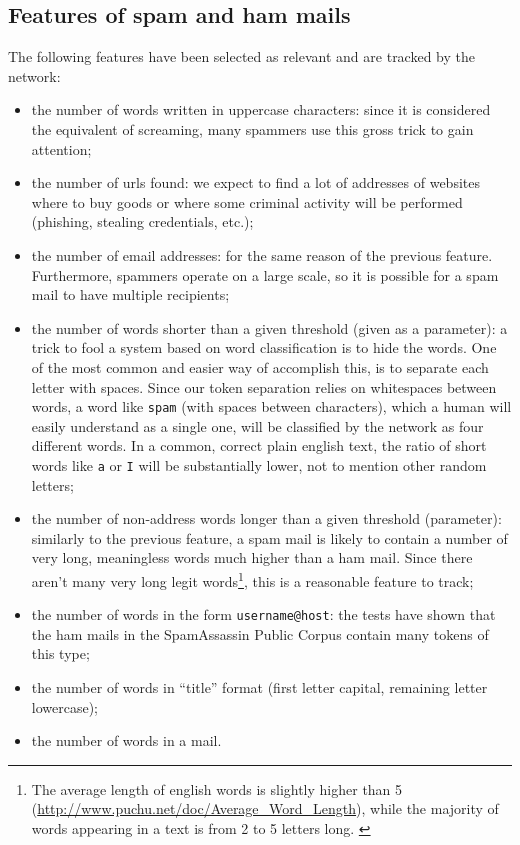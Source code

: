 \subsection{Features of spam and ham mails}
\label{featuresused} The following features have been selected as relevant and are tracked by the network:
\begin{itemize}[noitemsep]
  \item the number of words written in uppercase characters: since it is considered the equivalent of screaming, many spammers use this gross trick to gain attention;
  \item the number of urls found: we expect to find a lot of addresses of websites where to buy goods or where some criminal activity will be performed (phishing, stealing credentials, etc.);
  \item the number of email addresses: for the same reason of the previous feature. Furthermore, spammers operate on a large scale, so it is possible for a spam mail to have multiple recipients;
  \item the number of words shorter than a given threshold (given as a parameter): a trick to fool a system based on word classification is to hide the words. One of the most common and easier way of accomplish this, is to separate each letter with spaces. Since our token separation relies on whitespaces between words, a word like \texttt{s\textvisiblespace p\textvisiblespace a\textvisiblespace m} (with spaces between characters), which a human will easily understand as a single one, will be classified by the network as four different words. In a common, correct plain english text, the ratio of short words like \verb!a! or \verb!I! will be substantially lower, not to mention other random letters;
  \item the number of non-address words longer than a given threshold (parameter): similarly to the previous feature, a spam mail is likely to contain a number of very long, meaningless words much higher than a ham mail. Since there aren't many very long legit words\footnote{The average length of english words is slightly higher than 5 (\url{http://www.puchu.net/doc/Average_Word_Length}), while the majority of words appearing in a text is from 2 to 5 letters long. \citep{STUL:STUL109}}, this is a reasonable feature to track;
  \item the number of words in the form \verb!username@host!: the tests have shown that the ham mails in the SpamAssassin Public Corpus contain many tokens of this type;
  \item the number of words in ``title'' format (first letter capital, remaining letter lowercase);
  \item the number of words in a mail.
\end{itemize}

